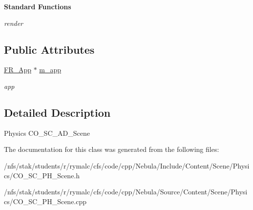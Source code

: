 \begin{Indent}{\bf Standard Functions}
\begin{DoxyCompactItemize}
\begin{DoxyCompactList}\small\item\em render \item\end{DoxyCompactList}\end{DoxyCompactItemize}
\end{Indent}
\subsection*{Public Attributes}
\begin{DoxyCompactItemize}
\item 
\hypertarget{classContent_1_1Scene_1_1Physics_1_1Scene_a66824215ac882e316b1e73a81f31e7ad}{
\hyperlink{classFramework_1_1App}{FR\_\-App} $\ast$ \hyperlink{classContent_1_1Scene_1_1Physics_1_1Scene_a66824215ac882e316b1e73a81f31e7ad}{m\_\-app}}
\label{classContent_1_1Scene_1_1Physics_1_1Scene_a66824215ac882e316b1e73a81f31e7ad}

\begin{DoxyCompactList}\small\item\em app \item\end{DoxyCompactList}\end{DoxyCompactItemize}


\subsection{Detailed Description}
Physics CO\_\-SC\_\-AD\_\-Scene 

The documentation for this class was generated from the following files:\begin{DoxyCompactItemize}
\item 
/nfs/stak/students/r/rymalc/cfs/code/cpp/Nebula/Include/Content/Scene/Physics/CO\_\-SC\_\-PH\_\-Scene.h\item 
/nfs/stak/students/r/rymalc/cfs/code/cpp/Nebula/Source/Content/Scene/Physics/CO\_\-SC\_\-PH\_\-Scene.cpp\end{DoxyCompactItemize}
